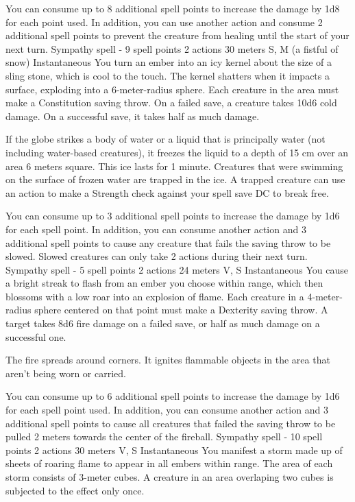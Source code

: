         You can consume up to 8 additional spell points to increase the damage by 1d8 for each point used.
        In addition, you can use another action and consume 2 additional spell points to prevent the creature from healing until the start of your next turn.
        {Sympathy spell - 9 spell points}
        {2 actions}
        {30 meters}
        {S, M (a fistful of snow)}
        {Instantaneous}
        You turn an ember into an icy kernel about the size of a sling stone, which is cool to the touch.
        The kernel shatters when it impacts a surface, exploding into a 6-meter-radius sphere.
        Each creature in the area must make a Constitution saving throw.
        On a failed save, a creature takes 10d6 cold damage.
        On a successful save, it takes half as much damage.

        If the globe strikes a body of water or a liquid that is principally water (not including water-based creatures), it freezes the liquid to a depth of 15 cm over an area 6 meters square.
        This ice lasts for 1 minute.
        Creatures that were swimming on the surface of frozen water are trapped in the ice.
        A trapped creature can use an action to make a Strength check against your spell save DC to break free.

        You can consume up to 3 additional spell points to increase the damage by 1d6 for each spell point.
        In addition, you can consume another action and 3 additional spell points to cause any creature that fails the saving throw to be slowed.
        Slowed creatures can only take 2 actions during their next turn.
        {Sympathy spell - 5 spell points}
        {2 actions}
        {24 meters}
        {V, S}
        {Instantaneous}
        You cause a bright streak to flash from an ember you choose within range, which then blossoms with a low roar into an explosion of flame.
        Each creature in a 4-meter-radius sphere centered on that point must make a Dexterity saving throw.
        A target takes 8d6 fire damage on a failed save, or half as much damage on a successful one.

        The fire spreads around corners.
        It ignites flammable objects in the area that aren't being worn or carried.

        You can consume up to 6 additional spell points to increase the damage by 1d6 for each spell point used.
        In addition, you can consume another action and 3 additional spell points to cause all creatures that failed the saving throw to be pulled 2 meters towards the center of the fireball.
        {Sympathy spell - 10 spell points}
        {2 actions}
        {30 meters}
        {V, S}
        {Instantaneous}
        You manifest a storm made up of sheets of roaring flame to appear in all embers within range.
        The area of each storm consists of 3-meter cubes.
        A creature in an area overlaping two cubes is subjected to the effect only once.

